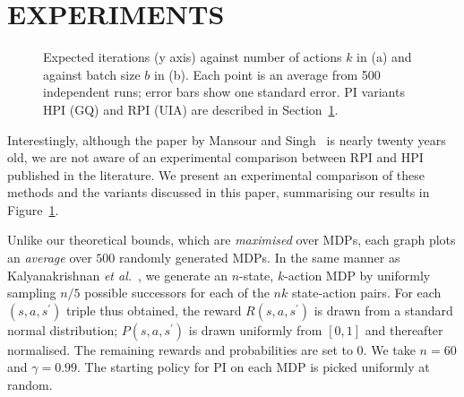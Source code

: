 \section{EXPERIMENTS}
\label{sec:experiments}



\begin{figure}[t]
\centering%
%
\hspace{0.5cm}
%
\caption{Expected iterations (y axis) against number of actions $k$ in (a) and against batch size $b$ in (b). Each point is an average from 500 independent runs; error bars show one standard error. PI variants HPI (GQ) and RPI (UIA) are described in Section~\ref{sec:experiments}.}
\label{fig:experiments}
\end{figure}
Interestingly, although the paper by Mansour and Singh~ is nearly twenty years old, we are not aware of an experimental comparison between RPI and HPI  published in the literature. We present an experimental comparison of these methods and the variants discussed in this paper, summarising our results in Figure~\ref{fig:experiments}. 

Unlike our theoretical bounds, which are \textit{maximised} over MDPs, each graph plots an \textit{average} over $500$ randomly generated MDPs. In the same manner as  Kalyanakrishnan \textit{et al.}~, we generate an $n$-state, $k$-action MDP by uniformly sampling $n / 5$ possible successors for each of the $nk$ state-action pairs. For each $(s,a,s^{\prime})$ triple thus obtained, the reward $R(s,a,s^{\prime})$ is drawn from a standard normal distribution; $P(s,a,s^{\prime})$ is drawn uniformly from $[0,1]$ and thereafter normalised. The remaining rewards and probabilities are set to $0$. We take $n = 60$ and $\gamma =  0.99$. The starting policy for PI on each MDP is picked uniformly at random.


